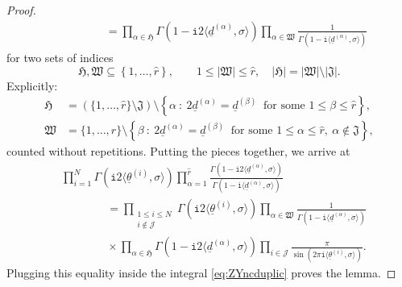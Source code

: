 \documentclass[12pt,a4paper,oneside]{amsart}
\numberwithin{equation}{section}
\theoremstyle{definition}
\theoremstyle{remark}
\newcommand{\ii}{\mathtt{i}}
\begin{document}
\begin{proof}
\begin{equation*}
\begin{aligned}
	& \qquad \qquad = \prod_{\alpha \in \mathfrak{H}} \Gamma \left( 1 - \ii 2 \langle\underline{d}^{(\alpha)}, \sigma \rangle \right) \prod_{\alpha \in \mathfrak{W}} \frac{1}{\Gamma \left( 1 - \ii \langle\underline{d}^{(\alpha)}, \sigma \rangle \right)}
\end{aligned}
\end{equation*}
for two sets of indices
\begin{equation*}
	\mathfrak{H},\mathfrak{W} \subseteq \left\{ 1, \dots, \hat{r} \right\} , \qquad 1 \le  \lvert \mathfrak{W} \rvert \le \hat{r} , \quad \lvert \mathfrak{H}\rvert =  \lvert \mathfrak{W} \rvert \setminus \lvert \mathfrak{J} \rvert .
\end{equation*}
Explicitly:
\begin{equation*}
\begin{aligned}
    \mathfrak{H} & =  \left( \{1, \dots, \hat{r} \} \setminus \mathfrak{J} \right) \setminus \left\{ \alpha \ : \ 2\underline{d}^{(\alpha)} = \underline{d}^{(\beta)} \ \text{ for some } 1 \le \beta \le \hat{r} \right\} , \\
    \mathfrak{W} & = \{1, \dots, \hat{r} \}  \setminus  \left\{ \beta \ : \ 2\underline{d}^{(\alpha)} = \underline{d}^{(\beta)} \ \text{ for some } 1 \le \alpha \le \hat{r}, \ \alpha \notin \mathfrak{J} \right\}  ,
\end{aligned}
\end{equation*}
counted without repetitions. Putting the pieces together, we arrive at 
\begin{align*}
	& \prod_{i=1}^{N} \Gamma \left( \ii 2 \langle \underline{\theta}^{(i)}, \sigma \rangle \right) \prod_{\alpha=1}^{\hat{r}} \frac{\Gamma \left( 1 - \ii 2 \langle\underline{d}^{(\alpha)}, \sigma \rangle \right) }{\Gamma \left( 1 - \ii \langle\underline{d}^{(\alpha)}, \sigma \rangle \right)} \\
 & \qquad \qquad = \prod_{\substack{ 1 \le i \le N \\ i \notin \mathcal{J} }} \Gamma \left( \ii 2 \langle \underline{\theta}^{(i)}, \sigma \rangle \right) \prod_{\alpha \in \mathfrak{W}} \frac{1}{\Gamma \left( 1 - \ii \langle\underline{d}^{(\alpha)}, \sigma \rangle \right)}\\
	& \qquad \qquad \times \prod_{\alpha\in \mathfrak{H} } \Gamma \left( 1 - \ii 2 \langle\underline{d}^{(\alpha)}, \sigma \rangle \right)  \prod_{i \in \mathcal{J} } \frac{\pi}{\sin \left( 2 \pi \ii \langle \underline{\theta}^{(i)}, \sigma \rangle\right)} .
\end{align*}
Plugging this equality inside the integral \eqref{eq:ZYncduplic} proves the lemma.
\end{proof}
\end{document}
